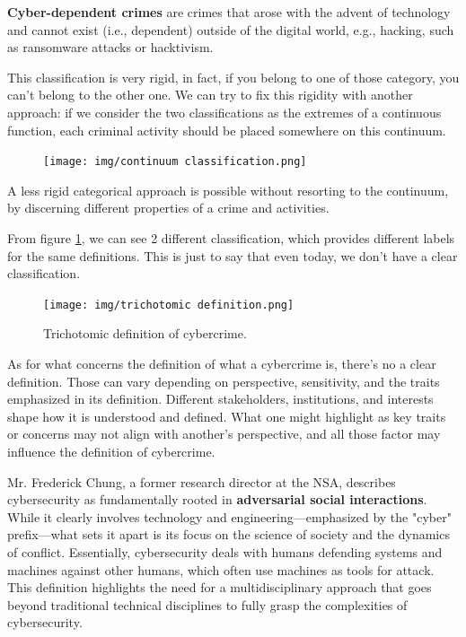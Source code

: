 \textbf{Cyber-dependent crimes} are crimes that arose with the advent
of technology and cannot exist (i.e., dependent) outside of the
digital world, e.g., hacking, such as ransomware attacks or
hacktivism.

This classification is very rigid, in fact, if you belong to one of
those category, you can't belong to the other one. We can try to fix
this rigidity with another approach: if we consider the two
classifications as the extremes of a continuous function, each criminal
activity should be placed somewhere on this continuum.

\begin{figure}[H]
  \centering
  \texttt{[image: img/continuum
  classification.png]}
\end{figure}

A less rigid categorical approach is possible without resorting to
the continuum, by discerning different properties of a crime and
activities. 


From figure \ref{fig:trichotomic-def}, we can see 2 different
classification, which provides different labels for the same
definitions. This is just to say that even today, we don't have a
clear classification.

\begin{figure}[h]
  \centering
  \texttt{[image: img/trichotomic
  definition.png]}
  \caption{Trichotomic definition of cybercrime.}
  \label{fig:trichotomic-def}
\end{figure}

As for what concerns the definition of what a cybercrime is, there's
no a clear definition. Those can vary depending on perspective,
sensitivity, and the traits emphasized in its definition. Different
stakeholders, institutions, and interests shape how it is understood
and defined. What one might highlight as key traits or concerns may
not align with another's perspective, and all those factor may
influence the definition of cybercrime.

Mr. Frederick Chung, a former research director at the NSA, describes
cybersecurity as fundamentally rooted in \textbf{adversarial social
interactions}. While it clearly involves technology and
engineering—emphasized by the "cyber" prefix—what sets it apart is its
focus on the science of society and the dynamics of conflict.
Essentially, cybersecurity deals with humans defending systems and
machines against other humans, which often use machines as tools for
attack. This definition highlights the need for a multidisciplinary
approach that goes beyond traditional technical disciplines to fully
grasp the complexities of cybersecurity.

